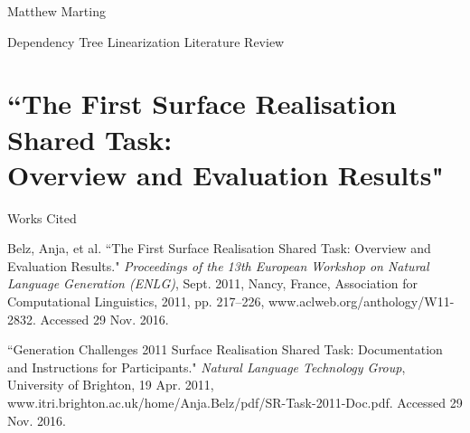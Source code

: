 \documentclass[12pt,letterpaper]{article}
\def \mylastname {Marting}
\def \myname {Matthew \mylastname{}}
\newenvironment{workscited}{
  \newcommand{\bibentry}{\noindent{}\hangindent=0.5in}
  \newpage{}
  {\centering{}Works Cited\par{}}
}{\newpage{}}
\begin{document}
\begin{flushleft}
  \myname{}\\
  {\centering{}Dependency Tree Linearization Literature Review\par{}}
  \setlength{\parindent}{0.5in}
  \section*{``The First Surface Realisation Shared Task:\\
  Overview and Evaluation Results"}
  \begin{workscited}
    \bibentry{}Belz, Anja, et al. ``The First Surface Realisation Shared Task: Overview and Evaluation Results." \textit{Proceedings of the 13th European Workshop on Natural Language Generation (ENLG)}, Sept. 2011, Nancy, France, Association for Computational Linguistics, 2011, pp. 217--226, www.aclweb.org/anthology/W11-2832. Accessed 29 Nov. 2016.

    \bibentry{}``Generation Challenges 2011 Surface Realisation Shared Task: Documentation and Instructions for Participants." \textit{Natural Language Technology Group}, University of Brighton, 19 Apr. 2011, www.itri.brighton.ac.uk/home/Anja.Belz/pdf/SR-Task-2011-Doc.pdf. Accessed 29 Nov. 2016.
  \end{workscited}
\end{flushleft}
\end{document}
